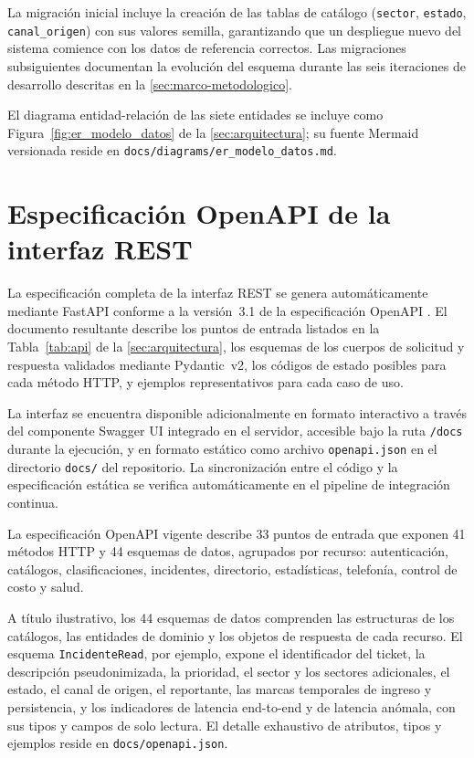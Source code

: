 La migración inicial incluye la creación de las tablas de catálogo (\texttt{sector}, \texttt{estado}, \texttt{canal\_origen}) con sus valores semilla, garantizando que un despliegue nuevo del sistema comience con los datos de referencia correctos. Las migraciones subsiguientes documentan la evolución del esquema durante las seis iteraciones de desarrollo descritas en la \autoref{sec:marco-metodologico}.

El diagrama entidad-relación de las siete entidades se incluye como Figura~\ref{fig:er_modelo_datos} de la \autoref{sec:arquitectura}; su fuente Mermaid versionada reside en \texttt{docs/diagrams/er\_modelo\_datos.md}.

\section{Especificación OpenAPI de la interfaz REST}\label{sec:anexo-openapi}

La especificación completa de la interfaz REST se genera automáticamente mediante FastAPI conforme a la versión~3.1 de la especificación OpenAPI \parencite{Tiangolo2024_fastapi}. El documento resultante describe los puntos de entrada listados en la Tabla~\ref{tab:api} de la \autoref{sec:arquitectura}, los esquemas de los cuerpos de solicitud y respuesta validados mediante Pydantic~v2, los códigos de estado posibles para cada método HTTP, y ejemplos representativos para cada caso de uso.

La interfaz se encuentra disponible adicionalmente en formato interactivo a través del componente Swagger UI integrado en el servidor, accesible bajo la ruta \texttt{/docs} durante la ejecución, y en formato estático como archivo \texttt{openapi.json} en el directorio \texttt{docs/} del repositorio. La sincronización entre el código y la especificación estática se verifica automáticamente en el pipeline de integración continua.

La especificación OpenAPI vigente describe 33 puntos de entrada que exponen 41 métodos HTTP y 44 esquemas de datos, agrupados por recurso: autenticación, catálogos, clasificaciones, incidentes, directorio, estadísticas, telefonía, control de costo y salud.

A título ilustrativo, los 44 esquemas de datos comprenden las estructuras de los catálogos, las entidades de dominio y los objetos de respuesta de cada recurso. El esquema \texttt{IncidenteRead}, por ejemplo, expone el identificador del ticket, la descripción pseudonimizada, la prioridad, el sector y los sectores adicionales, el estado, el canal de origen, el reportante, las marcas temporales de ingreso y persistencia, y los indicadores de latencia end-to-end y de latencia anómala, con sus tipos y campos de solo lectura. El detalle exhaustivo de atributos, tipos y ejemplos reside en \texttt{docs/openapi.json}.

